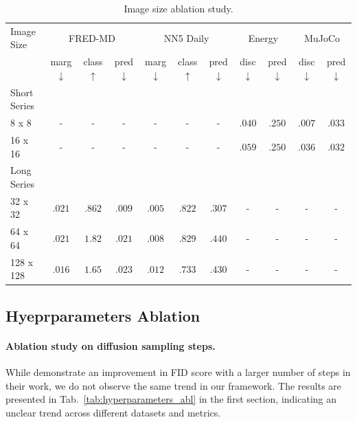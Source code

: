 \documentclass{article}
\begin{document}
\begin{table}[!ht]
    \centering
    \caption{Image size ablation study.}
    \label{tab:image_size_abl}
    \setlength{\tabcolsep}{2.5pt}
    \begin{tabular}{l|ccc|ccc|cc|cc}
        \toprule
        Image Size & \multicolumn{3}{c|}{FRED-MD} & \multicolumn{3}{c|}{NN5 Daily} & \multicolumn{2}{c|}{Energy} & \multicolumn{2}{c}{MuJoCo} \\ 
         & marg$\downarrow$ & class $\uparrow$ & pred $\downarrow$ & marg$\downarrow$ & class $\uparrow$ & pred $\downarrow$ & disc$\downarrow$ & pred $\downarrow$ & disc$\downarrow$ & pred $\downarrow$   \\
        \midrule
        Short Series\\
        8 x 8 & - & - & - & - & - & - & $\boldsymbol{.040}$ & $\boldsymbol{.250}$ & $\boldsymbol{.007}$ & $.033$ \\
        16 x 16 & - & - & - & - & - & - & $.059$ & $\boldsymbol{.250}$ & $.036$ & $\boldsymbol{.032}$ \\
        \midrule
        Long Series \\
        32 x 32 & $.021$ & $.862$ & $\boldsymbol{.009}$ & $\boldsymbol{.005}$ & $.822$ & $\boldsymbol{.307}$ & - & - & - & - \\
        64 x 64 & $.021$ & $\boldsymbol{1.82}$ & $.021$ & $.008$ & $\boldsymbol{.829}$ & $.440$ & - & - & - & - \\
        128 x 128 & $\boldsymbol{.016}$ & $1.65$ & $.023$ & $.012$ & $.733$ & $.430$ & - & - & - & - \\
        \bottomrule
    \end{tabular}
\end{table}





\subsection{Hyeprparameters Ablation}
\label{app:abl_hyperparams}

\paragraph{Ablation study on diffusion sampling steps.} While \cite{karras2022elucidating} demonstrate an improvement in FID score with a larger number of steps in their work, we do not observe the same trend in our framework. The results are presented in Tab.~\ref{tab:hyperparameters_abl} in the first section, indicating an unclear trend across different datasets and metrics.
\end{document}
